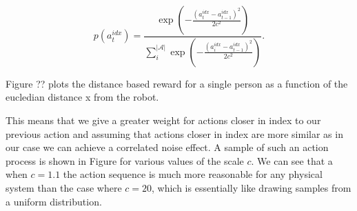 \documentclass[a4paper,11pt]{report}
\begin{document}
\begin{equation}
	p(a^{idx}_t) =\frac{\exp(-\frac{(a^{idx}_t-a^{idx}_{t-1})^2}{2c^2})}{\sum_i^{|\mathcal{A}|} \exp(-\frac{(a^{idx}_i-a^{idx}_{t-1})^2}{2c^2}) }.
\end{equation}

Figure ?? plots the distance based reward for a single person as a function of the eucledian distance x from the robot. 



This means that we give a greater weight for actions closer in index to our previous action and assuming that actions closer in index are more similar as in our case we can achieve a correlated noise effect. A sample of such an action process is shown in Figure for various values of the scale $c$. We can see that a when $c=1.1$ the action sequence is much more reasonable for any physical system than the case where $c=20$, which is essentially like drawing samples from a uniform distribution. 
\end{document}

